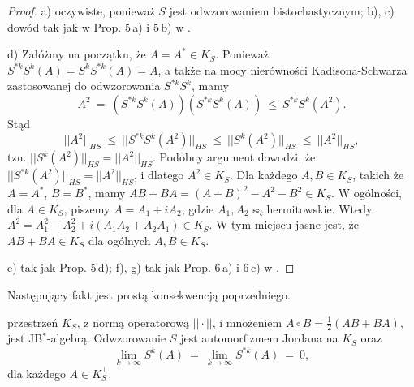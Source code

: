 {\begin{proof}
a) oczywiste, ponieważ $S$ jest odwzorowaniem bistochastycznym;
b), c) dowód tak jak w Prop. 5\,a) i 5\,b) w \cite{olkiewicz1999environment}.

d)  Załóżmy na początku, że $A = A^{*} \in K_{S}$.
Ponieważ $S^{*k} S^{k}(A) = S^{k} S^{*k}(A) = A$,
a także na mocy nierówności Kadisona-Schwarza zastosowanej do odwzorowania
$S^{*k} S^{k}$, mamy
\begin{equation}
A^{2} \: = \: \left( S^{*k} S^{k}(A) \right) \left( S^{*k} S^{k}(A) \right)
    \: \leq \: S^{*k} S^{k}(A^{2}).
\end{equation}
Stąd
\begin{equation}
||A^{2}||_{HS} \: \leq \: || S^{*k} S^{k}(A^{2}) ||_{HS} \: \leq \:
    || S^{k}(A^{2}) ||_{HS} \: \leq \: ||A^{2}||_{HS},
\end{equation}
tzn. $|| S^{k}(A^{2}) ||_{HS} = ||A^{2}||_{HS}$.
Podobny argument dowodzi, że
$|| S^{*k}(A^{2}) ||_{HS} = ||A^{2}||_{HS}$,
i dlatego $A^{2} \in K_{S}$.
Dla każdego $A, B \in K_{S}$, takich że $A = A^{*}$, $B = B^{*}$,
mamy
$AB + BA = (A + B)^{2} - A^{2} - B^{2} \in K_{S}$.
W ogólności, dla $A \in K_{S}$, piszemy
$A = A_{1} + i A_{2}$, gdzie $A_{1}, A_{2}$ są hermitowskie.
Wtedy
$A^{2} = A_{1}^{2} - A_{2}^{2} + i(A_{1} A_{2} + A_{2} A_{1}) \in K_{S}$.
W tym miejscu jasne jest, że $AB+BA \in K_{S}$ dla ogólnych $A,B \in K_{S}$.

e) tak jak Prop. 5\,d);
f), g) tak jak Prop. 6\,a) i 6\,c) w
\cite{olkiewicz1999environment}.
\end{proof}

Następujący fakt jest prostą konsekwencją poprzedniego.

\begin{Corollary}
\label{cor:KisJordanAlgebra}
przestrzeń $K_{S}$,
z normą operatorową $|| \cdot ||$,
i mnożeniem  $A \circ B = \frac{1}{2}(AB + BA)$,
jest JB$^{*}$-algebrą.
Odwzorowanie $S$ jest automorfizmem Jordana na $K_{S}$ oraz
\begin{equation}
\label{eq:SGoesTo0OnKOrth}
    \lim \limits_{k\rightarrow \infty} S^{k}(A)  \: = \:
    \lim \limits_{k\rightarrow \infty} S^{*k}(A) \: = \: 0,
\end{equation}
dla każdego $A \in K_{S}^{\perp}$.
\end{Corollary}

}

